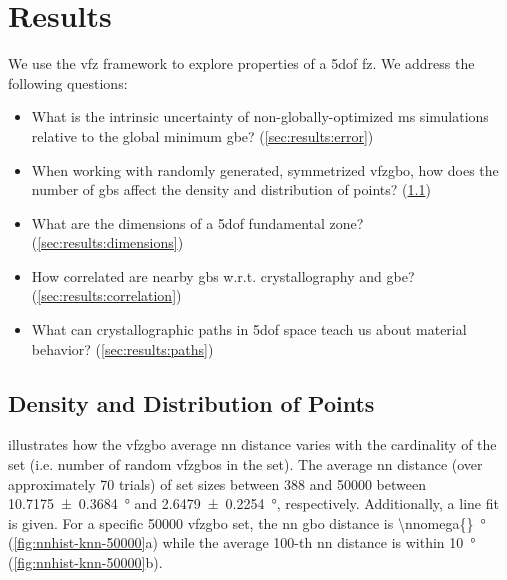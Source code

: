\documentclass[final,twocolumn,12pt]{elsarticle}
\begin{document}
	
	\section{Results} \label{sec:results}
	
	We use the \gls{vfz} framework to explore properties of a \gls{5dof} \gls{fz}. We address the following questions:
	\begin{itemize}
		\item What is the intrinsic uncertainty of non-globally-optimized \gls{ms} simulations relative to the global minimum \gls{gbe}? (\cref{sec:results:error})
		\item When working with randomly generated, symmetrized \gls{vfzgbo}, how does the number of \glspl{gb} affect the density and distribution of points? (\cref{sec:results:density})
		\item What are the dimensions of a \gls{5dof} fundamental zone? (\cref{sec:results:dimensions})
		\item How correlated are nearby \glspl{gb} w.r.t. crystallography and \gls{gbe}? (\cref{sec:results:correlation})
		\item What can crystallographic paths in \gls{5dof} space teach us about material behavior? (\cref{sec:results:paths})
	\end{itemize}
	
	
	\subsection{Density and Distribution of Points} \label{sec:results:density}
	
	 illustrates how the \gls{vfzgbo} average \gls{nn} distance varies with the cardinality of the set (i.e. number of random \glspl{vfzgbo} in the set). The average \gls{nn} distance (over approximately 70 trials) of set sizes between \num{388} and \num{50000} between \SI{10.7175 \pm 0.3684}{\degree} and \SI{2.6479 \pm 0.2254}{\degree}, respectively. Additionally, a line fit is given. For a specific \num{50000} \gls{vfzgbo} set, the \gls{nn} \gls{gbo} distance is \SI{\nnomega{}}{\degree} (\cref{fig:nnhist-knn-50000}a) while the average 100-th \gls{nn} distance is within \SI{10}{\degree} (\cref{fig:nnhist-knn-50000}b).
	
\end{document}
